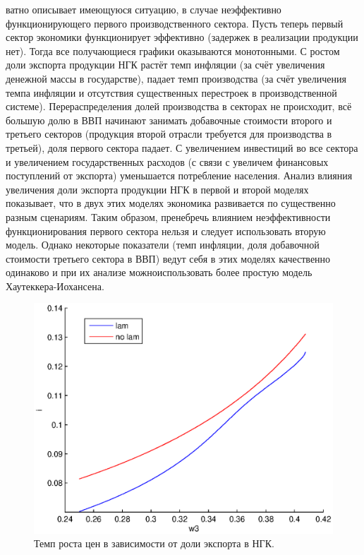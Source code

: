 \documentclass[12pt]{article}
\theoremstyle{rusdef}
\begin{document}
ватно описывает имеющуюся ситуацию, в случае неэффективно функционирующего первого производственного сектора. Пусть теперь первый сектор экономики функционирует эффективно (задержек в реализации продукции нет). Тогда все получающиеся графики оказываются монотонными. С ростом доли экспорта продукции НГК растёт темп инфляции (за счёт
увеличения денежной массы в государстве), падает темп производства (за счёт увеличения темпа инфляции и отсутствия существенных перестроек в производственной системе). Перераспределения долей производства в секторах не происходит, всё большую долю в ВВП начинают занимать добавочные стоимости второго и третьего секторов (продукция второй отрасли требуется для производства в третьей), доля первого сектора падает. С увеличением инвестиций во все сектора и увеличением государственных расходов (с связи с увеличем финансовых поступлений от экспорта) уменьшается потребление населения. Анализ влияния увеличения доли экспорта продукции НГК в первой и второй моделях показывает, что в двух этих моделях экономика развивается по существенно разным сценариям. Таким образом, пренебречь влиянием неэффективности функционирования первого сектора нельзя и следует использовать вторую модель. Однако некоторые показатели (темп инфляции, доля добавочной стоимости третьего сектора
в ВВП) ведут себя в этих моделях качественно одинаково и при их анализе можноиспользовать более простую модель Хаутеккера-Иохансена.
\begin{figure}[h!]
	\centering
	\includegraphics[scale=0.8]{pics/w3_i.eps}
	\caption{Темп роста цен в зависимости от доли экспорта в НГК.}
\end{figure}
\end{document}
